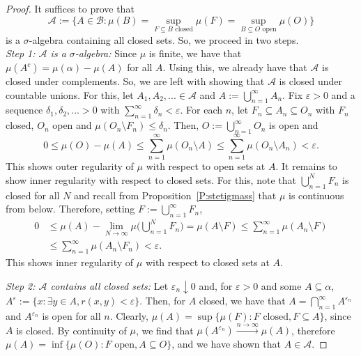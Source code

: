 \documentclass[lean]{AFM}
\begin{document}
\begin{proof}
  It suffices to prove that
  $$ \mathcal A := \Big\{A \in \mathcal B : \mu(B) = \sup_{F\subseteq
    B \text{ closed}} \mu(F) = \sup_{B\subseteq O \text{ open}}
  \mu(O)\Big\} $$ is a $\sigma$-algebra containing all closed
  sets. So, we proceed in two steps.  \\ {\em Step 1: $\mathcal A$ is
    a $\sigma$-algebra:} Since $\mu$ is finite, we have that $\mu(A^c)
  = \mu(\alpha) - \mu(A)$ for all $A$. Using this, we already have
  that $\mathcal A$ is closed under complements. So, we are left with
  showing that $\mathcal A$ is closed under countable unions. For
  this, let $A_1, A_2,... \in \mathcal A$ and $A :=
  \bigcup_{n=1}^\infty A_n$. Fix $\varepsilon > 0$ and a sequence
  $\delta_1, \delta_2,... > 0$ with $\sum_{n=1}^\infty \delta_n <
  \varepsilon$. For each $n$, let $F_n \subseteq A_n \subseteq O_n$
  with $F_n$ closed, $O_n$ open and $\mu(O_n \setminus F_n) \leq
  \delta_n$. Then, $O := \bigcup_{n=1}^\infty O_n$ is open and
  $$ 0 \leq \mu(O) - \mu(A) \leq \sum_{n=1}^\infty \mu(O_n \setminus
  A) \leq \sum_{n=1}^\infty \mu(O_n \setminus A_n) < \varepsilon.$$
  This shows outer regularity of $\mu$ with respect to open sets at
  $A$. It remains to show inner regularity with respect to closed
  sets. For this, note that $\bigcup_{n=1}^N F_n$ is closed for all
  $N$ and recall from Proposition~\ref{P:stetigmass} that $\mu$ is
  continuous from below. Therefore, setting $F := \bigcup_{n=1}^\infty
  F_n$,
  \begin{align*}
    0 & \leq \mu(A) - \lim_{N\to\infty} \mu\Big(\bigcup_{n=1}^N
    F_n\Big) = \mu(A \setminus F) \leq \sum_{n=1}^\infty \mu(A_n
    \setminus F) \\ & \leq \sum_{n=1}^\infty \mu(A_n \setminus F_n) <
    \varepsilon.
  \end{align*}
  This shows inner regularity of $\mu$ with respect to closed sets at
  $A$.


  \noindent
  {\em Step 2: $\mathcal A$ contains all closed sets:} Let
  $\varepsilon_ n\downarrow 0$ and, for $\varepsilon>0$ and some $A
  \subseteq \alpha$, $A^\varepsilon := \{x : \exists y \in A,
  r(x,y)<\varepsilon\}$. Then, for $A$ closed, we have that $A =
  \bigcap_{n=1}^\infty A^{\varepsilon_n}$ and $A^{\varepsilon_n}$ is
  open for all $n$. Clearly, $\mu(A) = \sup\{\mu(F): F\text{ closed},
  F \subseteq A\}$, since $A$ is closed. By continuity of $\mu$, we
  find that $\mu(A^{\varepsilon_n}) \xrightarrow{n\to\infty} \mu(A)$,
  therefore $\mu(A) = \inf\{\mu(O): F\text{ open}, A \subseteq O\}$,
  and we have shown that $A \in \mathcal A$.
\end{proof}
\end{document}
